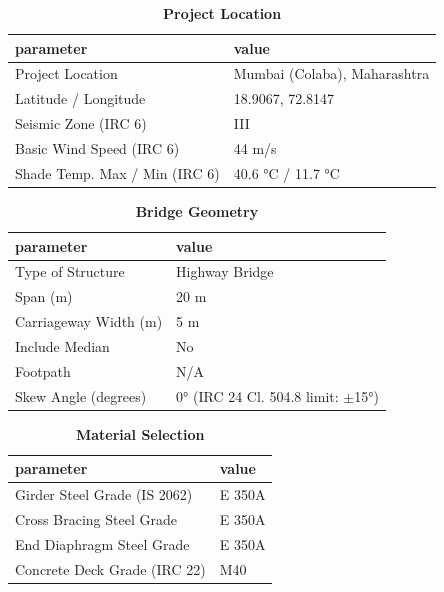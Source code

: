 \documentclass[12pt,a4paper]{report}
\numberwithin{table}{chapter}
\numberwithin{figure}{chapter}
\begin{document}
\begin{table}[H]
\caption{\textbf{Project Location}}
\label{subsec:project-location}
\begin{tabular}{|L{5.5cm}|L{8.5cm}|}
\hline
\textbf{parameter} & \textbf{value} \\
\hline
\textnormal{Project Location} & Mumbai (Colaba), Maharashtra \\
\hline
\textnormal{Latitude / Longitude} & 18.9067, 72.8147 \\
\hline
\textnormal{Seismic Zone (IRC 6)} & III \\
\hline
\textnormal{Basic Wind Speed (IRC 6)} & 44 m/s \\
\hline
\textnormal{Shade Temp. Max / Min (IRC 6)} & 40.6 °C / 11.7 °C \\
\hline
\end{tabular}
\vspace{0.4cm}
\end{table}

\begin{table}[H]
\caption{\textbf{Bridge Geometry}}
\label{subsec:bridge-geometry}
\begin{tabular}{|L{5.5cm}|L{8.5cm}|}
\hline
\textbf{parameter} & \textbf{value} \\
\hline
\textnormal{Type of Structure} & Highway Bridge \\
\hline
\textnormal{Span (m)} & 20 m \\
\hline
\textnormal{Carriageway Width (m)} & 5 m \\
\hline
\textnormal{Include Median} & No \\
\hline
\textnormal{Footpath} & N/A \\
\hline
\textnormal{Skew Angle (degrees)} & 0° (IRC 24 Cl. 504.8 limit: $\pm$15°) \\
\hline
\end{tabular}
\end{table}
\vspace{0.4cm}

\begin{table}[H]
\caption{\textbf{Material Selection}}
\label{subsec:material}
\begin{tabular}{|L{5.5cm}|L{8.5cm}|}
\hline
\textbf{parameter} & \textbf{value} \\
\hline
\textnormal{Girder Steel Grade (IS 2062)} & E 350A \\
\hline
\textnormal{Cross Bracing Steel Grade} & E 350A \\
\hline
\textnormal{End Diaphragm Steel Grade} & E 350A \\
\hline
\textnormal{Concrete Deck Grade (IRC 22)} & M40 \\
\hline
\end{tabular}
\end{table}
\vspace{0.4cm}
\end{document}

